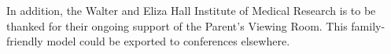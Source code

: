 \documentclass[twocolumn]{bmcart}%
\begin{document}
In addition, the Walter and Eliza Hall Institute of Medical Research is to be thanked for their ongoing support of the Parent's Viewing Room.  This family-friendly model could be exported to conferences elsewhere.



\end{document}
